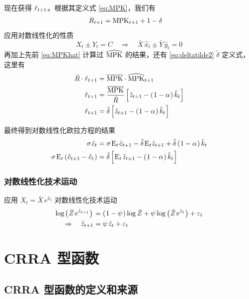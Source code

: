 现在获得 \(\hat r_{t+1}\)。根据其定义式 \ref{eq:MPK}，我们有
\begin{align*}
R_{t+1}&=\text{MPK}_{t+1}+1-\delta
\end{align*}
应用对数线性化的性质
\begin{equation*}
    X_t\pm Y_t=C\quad\Rightarrow\quad \bar X\,\hat x_t\pm\bar Y\,\hat y_t=0
\end{equation*}
再加上先前 \ref{eq:MPKhat} 计算过 \(\widehat{\text{MPK}}\) 的结果，还有 \ref{eq:deltatilde2} \(\tilde\delta\) 定义式，这里有
\begin{align*}
    \bar R\cdot\hat r_{t+1}&=\overline{\text{MPK}} \cdot\widehat{\text{MPK}}_{t+1}\\
    \hat r_{t+1}&=\dfrac{\overline{\text{MPK}}}{\bar R}\left[\mspace{1mu}\hat z_{t+1}-\left(\mspace{1mu}1-\alpha\mspace{1mu}\right)\hat k_t\mspace{1mu}\right]\\
    \hat r_{t+1}&=\tilde\delta\left[\mspace{1mu}\hat z_{t+1}-\left(\mspace{1mu}1-\alpha\mspace{1mu}\right)\hat k_t\mspace{1mu}\right]
\end{align*}

最终得到对数线性化欧拉方程的结果
\begin{align*}
    \sigma\,\hat c_t&=\sigma\,\mean_t\,\hat c\nt-\tilde\delta\,\mean_t\hat z\nt+\tilde\delta\bka{1-\alpha}\hat k_t\\
    \sigma\,\mean_t\bka{\hat c\nt-\hat c_t}&=\tilde\delta\bks{\mean_t\,\hat z\nt-\bka{1-\alpha}\hat k_t}
\end{align*}

\subsubsection{对数线性化技术运动}

应用 \(X_t=\bar X\,e^{\hat x_t}\) 对数线性化技术运动
\begin{align*}
    \log\pa{\bar Z\,e^{\hat z\nt}}&=\bka{1-\psi}\log\bar Z+\psi\log\bka{\bar Z\,e^{\hat z_t}}+\varepsilon_t\\
    \Rightarrow\quad \hat z\nt&=\psi\,\hat z_t+\varepsilon_t
\end{align*}

\section{CRRA 型函数}\label{sec:CRRA}

\subsection{CRRA 型函数的定义和来源}\label{subsec:CRRAdef}


